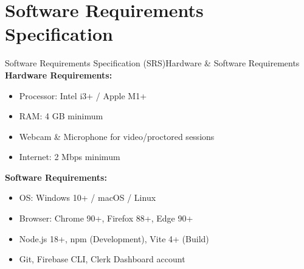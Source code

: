 \documentclass{beamer}
\begin{document}
\section{Software Requirements Specification}
\begin{frame}{Software Requirements Specification (SRS)}{Hardware \& Software Requirements}
\textbf{Hardware Requirements:}
\begin{itemize}
    \item Processor: Intel i3+ / Apple M1+
    \item RAM: 4 GB minimum
    \item Webcam \& Microphone for video/proctored sessions
    \item Internet: 2 Mbps minimum
\end{itemize}

\vspace{3pt}

\textbf{Software Requirements:}
\begin{itemize}
    \item OS: Windows 10+ / macOS / Linux
    \item Browser: Chrome 90+, Firefox 88+, Edge 90+
    \item Node.js 18+, npm (Development), Vite 4+ (Build)
    \item Git, Firebase CLI, Clerk Dashboard account
\end{itemize}
\end{frame}
\end{document}
